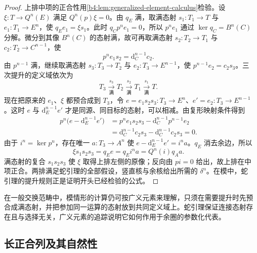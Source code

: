 \begin{proof}
	上排中项的正合性用\cref{b4:lem:generalized-element-calculus}检验。设 \(\xi:T\to Q^n(E)\) 满足 \(Q^n(p)\xi=0\)。由 \(q_E\) 满，取满态射 \(s_1:T_1\to T\) 与 \(e_1:T_1\to E^n\)，使 \(q_Ee_1=\xi s_1\)。此时 \(q_Cp^ne_1=0\)，所以 \(p^ne_1\) 通过 \(\ker q_C=B^n(C)\) 分解。微分到其像 \(B^n(C)\) 的态射满，故可再取满态射 \(s_2:T_2\to T_1\) 与 \(c_2:T_2\to C^{n-1}\)，使
	\[
		p^ne_1s_2=\mathrm{d}_C^{n-1}c_2.
	\]
	由 \(p^{n-1}\) 满，继续取满态射 \(s_3:T_3\to T_2\) 与 \(e_2:T_3\to E^{n-1}\)，使 \(p^{n-1}e_2=c_2s_3\)。三次提升的定义域依次为
	\[
		T_3\xrightarrow[\text{满}]{s_3}T_2 \xrightarrow[\text{满}]{s_2}T_1 \xrightarrow[\text{满}]{s_1}T.
	\]
	现在把原来的 \(e_1\)、\(\xi\) 都预合成到 \(T_3\)，令 \(e=e_1s_2s_3:T_3\to E^n\)、\(e'=e_2:T_3\to E^{n-1}\)。这时 \(e\) 与 \(\mathrm{d}_E^{n-1}e'\) 才是同源、同目标的态射，可以相减。由复形映射条件得到
	\[
		\begin{aligned}
			p^n\bigl(e-\mathrm{d}_E^{n-1}e'\bigr) &=p^ne_1s_2s_3-\mathrm{d}_C^{n-1}p^{n-1}e_2\\
			&=\mathrm{d}_C^{n-1}c_2s_3-\mathrm{d}_C^{n-1}c_2s_3=0.
		\end{aligned}
	\]
	由于 \(i^n=\ker p^n\)，存在唯一 \(a:T_3\to A^n\) 使 \(e-\mathrm{d}_E^{n-1}e'=i^na\)。\(q_E\) 消去余边，所以
	\[
		\xi s_1s_2s_3=q_Ee=q_Ei^na=Q^n(i)q_Aa.
	\]
	满态射的复合 \(s_1s_2s_3\) 使 \(\xi\) 取得上排左侧的原像；反向由 \(pi=0\) 给出，故上排在中项正合。两排满足蛇引理的全部假设，竖直核与余核给出所需的 \(\delta^n\)。在模中，蛇引理的提升规则正是证明开头已经检验的公式。
\end{proof}

在一般交换范畴中，模情形的计算仍可按广义元素来理解，只须在需要提升时先预合成满态射，并把参加同一运算的态射放到共同定义域上。蛇引理保证连接态射存在且与选择无关，广义元素的追踪说明它如何作用于余圈的参数化代表。

\subsection{长正合列及其自然性}
\label{b4:subsec:0503:02}

